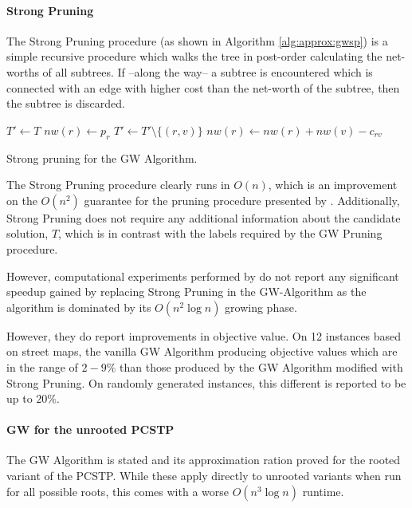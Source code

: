  \paragraph{Strong Pruning} The Strong Pruning procedure
 (as shown in Algorithm \ref{alg:approx:gwsp})
 is a simple recursive procedure which walks the tree in post-order calculating the net-worths
 of all subtrees. If --along the way-- a subtree is encountered which is connected with an
  edge with higher cost than the net-worth of the subtree, then the subtree is discarded.
 \begin{algorithm}[h!]
   \begin{algorithmic}[1]
     \State $T' \gets T$
     \State $nw(r) \gets p_r$
     \State {}
     \State $T' \gets T' \setminus \{(r,v)\}$
     \Else
     \State $nw(r) \gets nw(r) + nw(v) - c_{rv}$
     \EndIf
     \EndFor
   \EndProcedure
 \end{algorithmic}
 \caption{Strong pruning for the GW Algorithm.}\label{alg:approx:gwsp}
\end{algorithm}

The Strong Pruning procedure clearly runs in $O(n)$, which is an improvement on the $O(n^2)$
guarantee for the pruning procedure presented by \cite{goemans1995general}. Additionally,
Strong Pruning does not require any additional information about the candidate solution, $T$,
which is in contrast with the labels required by the GW Pruning procedure.

However, computational experiments performed by \cite{Johnson:2000:PCS:338219.338637}
do not report any significant speedup gained by replacing Strong Pruning in the GW-Algorithm
as the algorithm is dominated by its $O(n^2 \log n)$ growing phase.

However, they do report
improvements in objective value. On 12 instances based on street maps,
the vanilla GW Algorithm producing objective values which are in the range of $2-9\%$
than those produced by the GW Algorithm modified with Strong Pruning. On randomly
 generated instances, this different is reported to be up to $20\%$.
\paragraph{GW for the unrooted PCSTP}
The GW Algorithm is stated and its approximation ration proved
for the rooted variant of the PCSTP. While these apply directly to unrooted variants
when run for all possible roots, this comes with
a worse $O(n^3 \log n)$ runtime.

